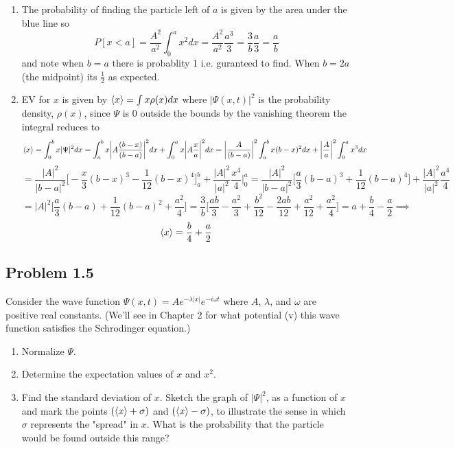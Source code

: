\documentclass[12pt]{exam}
\begin{document}
\begin{solution}
\begin{enumerate}
        \item The probability of finding the particle left of $a$ is given by the area under the blue line so 
        $$P[x<a] = \frac{A^2}{a^2}\int^a_0 x^2dx =  \frac{A^2}{a^2}\frac{a^3}{3}  = \frac{3}{b}\frac{a}{3}=\frac{a}{b}$$ and note when $b=a$ there is probablity 1 i.e. guranteed to find. When $b=2a$ (the midpoint) its $\frac{1}{2}$ as expected.

        \item EV for $x$ is given by $\expval{x} = \int x \rho(x)dx$ where $|\Psi(x,t)|^2$ is the probability density, $\rho(x)$, since $\Psi$ is 0 outside the bounds by the vanishing theorem the integral reduces to   
        $$\expval{x} = \int^b_0 x|\Psi|^2dx = \int^b_a x\bigg|A\frac{(b-x)}{(b-a)}\bigg|^2dx + \int^a_0 x\bigg|A\frac{x}{a}\bigg|^2dx = \bigg|\frac{A}{(b-a)}\bigg|^2\int^b_a x(b-x)^2dx + \bigg|\frac{A}{a}\bigg|^2\int^a_0 x^3 dx$$
        $$=\frac{|A|^2}{|b-a|^2}\bigg[-\frac{x}{3}(b-x)^3 -\frac{1}{12}(b-x)^4\bigg]^b_a + \frac{|A|^2}{|a|^2}\frac{x^4}{4}\bigg|^a_0 = \frac{|A|^2}{|b-a|^2}\bigg[\frac{a}{3}(b-a)^3 +\frac{1}{12}(b-a)^4\bigg] + \frac{|A|^2}{|a|^2}\frac{a^4}{4}$$
        $$=|A|^2 \bigg[\frac{a}{3}(b-a) +\frac{1}{12}(b-a)^2 + \frac{a^2}{4}\bigg] = \frac{3}{b} \bigg[\frac{ab}{3}-\frac{a^2}{3} +\frac{b^2}{12}-\frac{2ab}{12} +\frac{a^2}{12} + \frac{a^2}{4}\bigg] = a + \frac{b}{4}-\frac{a}{2} \implies$$
        $$\expval{x} = \frac{b}{4}+\frac{a}{2}$$
    \end{enumerate}
\end{solution}



\subsection*{Problem 1.5}
Consider the wave function $\Psi(x,t) = Ae^{-\lambda|x|}e^{-i\omega t}$ where $A$, $\lambda$, and $\omega$ are positive real constants. (We'll see in Chapter 2 for what potential (v) this wave function satisfies the Schrodinger equation.)
\begin{enumerate}
    \item Normalize $\Psi$.
    \item Determine the expectation values of $x$ and $x^2$.
    \item Find the standard deviation of $x$. Sketch the graph of $|\Psi|^2$, as a function of $x$ and mark the points $(\expval{x}+\sigma)$ and $(\expval{x}-\sigma)$, to illustrate the sense in which $\sigma$ represents the "spread" in $x$. What is the probability that the particle would be found outside this range?
\end{enumerate}
\end{document}
